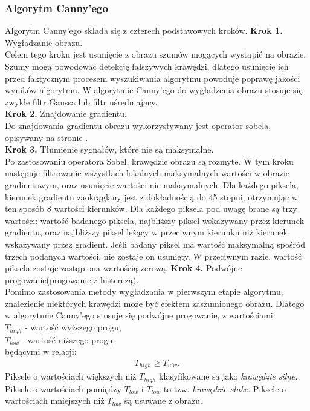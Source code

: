\subsubsection{Algorytm Canny'ego}
Algorytm Canny'ego składa się z czterech podstawowych kroków.
\textbf{Krok 1.} Wygładzanie obrazu. \\
  Celem tego kroku jest usunięcie z obrazu szumów mogących wystąpić na obrazie. Szumy mogą powodować detekcję fałszywych krawędzi, dlatego usunięcie ich przed faktycznym procesem wyszukiwania algorytmu powoduje poprawę jakości wyników algorytmu. W algorytmie Canny'ego do wygładzenia obrazu stosuje się zwykle filtr Gaussa lub filtr uśredniający. \\
\textbf{Krok 2.} Znajdowanie gradientu. \\
Do znajdowania gradientu obrazu wykorzystywany jest operator sobela, opisywany na stronie \pageref{sssec:sobel}.\\
\textbf{Krok 3.} Tłumienie sygnałów, które nie są maksymalne. \\
Po zastosowaniu operatora Sobel, krawędzie obrazu są rozmyte. W tym kroku następuje filtrowanie wszystkich lokalnych maksymalnych wartości w obrazie gradientowym, oraz usunięcie wartości nie-maksymalnych. Dla każdego piksela, kierunek gradientu zaokrąglany jest z dokładnością do 45 stopni, otrzymując w ten sposób 8 wartości kierunków. Dla każdego piksela pod uwagę brane są trzy wartości: wartość badanego piksela, najbliższy piksel wskazywany przez kierunek gradientu, oraz najbliższy piksel leżący w przeciwnym kierunku niż kierunek wskazywany przez gradient. Jeśli badany piksel ma wartość maksymalną spośród trzech podanych wartości, nie zostaje on usunięty. W przeciwnym razie, wartość piksela zostaje zastąpiona wartością zerową.
\textbf{Krok 4.} Podwójne progowanie(progowanie z histerezą).\\
  Pomimo zastosowania metody wygładzania w pierwszym etapie algorytmu, znalezienie niektórych krawędzi może być efektem zaszumionego obrazu. Dlatego w algorytmie Canny'ego stosuje się podwójne progowanie, z wartościami:\\
$T_{high}$ - wartość wyższego progu,\\
$T_{low}$ - wartość niższego progu,\\
będącymi w relacji:
\begin{gather*}
  T_{high} \geq T_{u'w}.
\end{gather*}
Piksele o wartościach większych niż $T_{high}$ klasyfikowane są jako \textit{krawędzie silne}. Piksele o wartościach pomiędzy $T_{low}$ i $T_{low}$ to tzw. \textit{krawędzie słabe}. Piksele o wartościach mniejszych niż $T_{low}$ są usuwane z obrazu.

